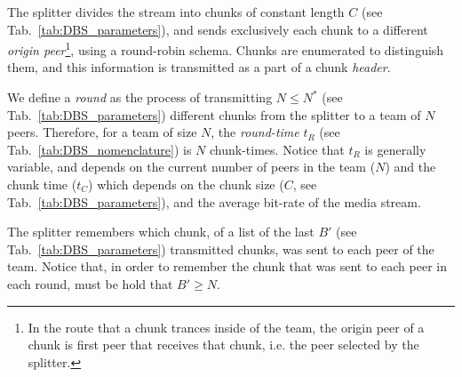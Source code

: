 
\label{sec:feeding_the_team}

The splitter divides the stream into chunks of constant length $C$
(see Tab.~\ref{tab:DBS_parameters}), and sends exclusively each
chunk to a different \emph{origin peer}\footnote{In the route that a
  chunk trances inside of the team, the origin peer of a chunk is
  first peer that receives that chunk, i.e. the peer selected by the
  splitter.}, using a round-robin schema. Chunks are enumerated to
distinguish them, and this information is transmitted as a part of a
chunk \emph{header}.

\begin{comment}
More details about the implementation
are available in Fig.~\ref{fig:chunk_generation}.


\begin{figure*}
  \fig{500}{5cm}{DBS_splitter_feed} \caption{Chunk
    generation at the splitter and their transmission to the
    team.\label{fig:chunk_generation}}
\end{figure*}
\end{comment}

We define a \emph{round} as the process of transmitting $N\leq N^*$
(see Tab.~\ref{tab:DBS_parameters}) different chunks from the splitter
to a team of $N$ peers. Therefore, for a team of size $N$, the
\emph{round-time} $t_R$ (see Tab.~\ref{tab:DBS_nomenclature}) is $N$
chunk-times. Notice that $t_R$ is generally variable, and depends on
the current number of peers in the team ($N$) and the chunk time
($t_C$) which depends on the chunk size ($C$, see
Tab.~\ref{tab:DBS_parameters}), and the average bit-rate of the media
stream.

The splitter remembers which chunk, of a list of the last $B'$ (see
Tab.~\ref{tab:DBS_parameters}) transmitted chunks, was sent to each
peer of the team. Notice that, in order to remember the chunk that was
sent to each peer in each round, must be hold that $B'\ge N$. 

\begin{comment}
(in a team) as the time necessary to send two consecutive chunks from
  the splitter (of such team) to the same peer, using the
  round-robing. This time is variable and depends on $|T|$, $C$, and
  the average bit-rate of the media, $A$.
\end{comment}


